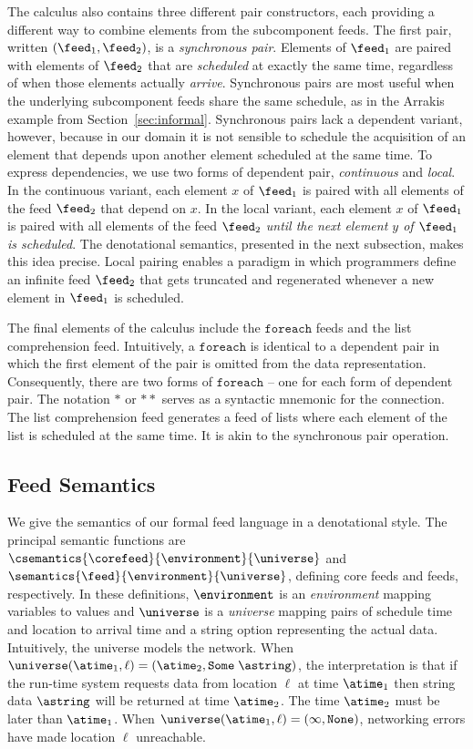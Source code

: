 The calculus also contains three different
pair constructors, each providing a different way to
combine elements from the subcomponent feeds.  The first pair, 
written $(\feed_1, \feed_2)$, is a {\em synchronous pair}.
Elements of $\feed_1$ are paired with elements of $\feed_2$
that are {\em scheduled} at exactly the same time, regardless of when those elements
actually {\em arrive}.  Synchronous pairs are most useful when the underlying
subcomponent feeds share the same schedule, as in the Arrakis example
from Section~\ref{sec:informal}.  Synchronous pairs lack a
dependent variant, however, because in our domain it is not sensible
to schedule the acquisition of an element that depends upon another
element scheduled at the same time.  To express dependencies, we 
use two forms of dependent pair, {\em continuous} and {\em local}.
In the continuous variant, each element $x$ of $\feed_1$ is paired 
with all elements of the feed $\feed_2$ that depend on $x$.  In the
local variant, each element $x$ of $\feed_1$
is paired with all elements of the feed $\feed_2$ {\em until the next
element $y$ of $\feed_1$ is scheduled}.  
The denotational semantics, presented
in the next subsection, makes this idea precise.  Local pairing
enables a paradigm in which programmers define an infinite feed $\feed_2$
that gets truncated and regenerated whenever a new element in $\feed_1$
is scheduled.


The final elements of the calculus include the $\mathtt{foreach}$ feeds
and the list comprehension feed.
Intuitively, a $\mathtt{foreach}$ is identical to a dependent pair in
which the first element of the pair is omitted from the data representation.
Consequently, there are two forms of $\mathtt{foreach}$ -- one for
each form of dependent pair.  The notation ${*}$ or ${**}$ serves as
a syntactic mnemonic for the connection.  The list comprehension
feed generates a feed of lists where each element of the list is
scheduled at the same time.  It is akin to the synchronous pair
operation. 


%



\subsection{Feed Semantics}
We give the semantics of our formal feed language in 
a denotational style.  The principal semantic functions are
$\csemantics{\corefeed}{\environment}{\universe}$ and
$\semantics{\feed}{\environment}{\universe}$, defining core feeds and
feeds, respectively.  In these definitions,
$\environment$ is an {\em environment} mapping variables to values
and $\universe$ is a {\em universe} mapping pairs of
schedule time and location to arrival time and a string option
representing the actual data.
Intuitively, the universe models the network.
When $\universe (\atime_1, \ell) = (\atime_2, \mathtt{Some} \; \astring)$,
 the interpretation is that if the run-time system requests data
from location $\ell$ at time $\atime_1$ then string data $\astring$
will be returned at time $\atime_2$.  The time $\atime_2$ must be
later than $\atime_1$.
When $\universe (\atime_1, \ell) = (\infty, \mathtt{None})$,
networking errors have made location $\ell$ unreachable.

